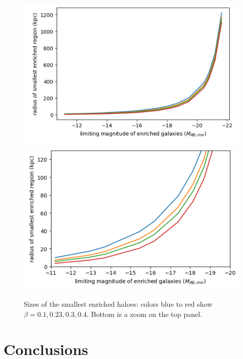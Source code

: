 \documentclass[useAMS,usenatbib]{mn2e}
\begin{document}
\begin{figure}
\includegraphics[width=\columnwidth]{plots/smallest1.png}
\includegraphics[width=\columnwidth]{plots/smallest2.png}
\caption{Sizes of the smallest enriched haloes: colors blue to red show $\beta=0.1, 0.23, 0.3, 0.4$. Bottom is a zoom on the top panel.}
\end{figure}







\section{Conclusions}

 
\end{document}
